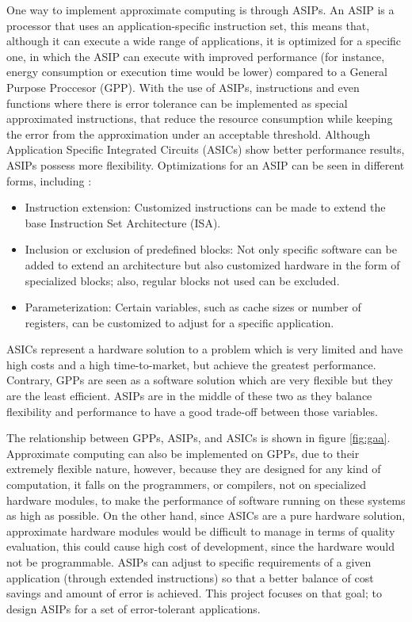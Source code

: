 \documentclass[conference]{IEEEtran}
\begin{document}
One way to implement approximate computing is through ASIPs. An ASIP is a processor that uses an application-specific instruction set, this means 
that, although it can execute a wide range of applications, it is optimized for a 
specific one, in which the ASIP can execute with improved performance (for instance, 
energy consumption or execution time would be lower) compared to a General Purpose Proccesor (GPP).
With the use of ASIPs, instructions and even functions where there is error tolerance can be
implemented as special approximated instructions, that reduce the resource consumption 
while keeping the error from the approximation under an acceptable threshold. Although Application Specific Integrated Circuits (ASICs) show better performance 
results, ASIPs possess more flexibility. Optimizations for an ASIP can be seen in different forms, 
including \cite{henkel2003closing}:

\begin{itemize}
 \item Instruction extension: Customized instructions can be made to extend the base Instruction Set Architecture (ISA).
 
 \item Inclusion or exclusion of predefined blocks: Not only specific software can be added 
 to extend an architecture but also customized hardware in the form of specialized blocks; 
 also, regular blocks not used can be excluded.
 
 \item Parameterization: Certain variables, such as cache sizes or number of registers, can 
 be customized to adjust for a specific application.
\end{itemize}

ASICs represent a hardware solution to a problem which is very limited and have high 
costs and a high time-to-market, but achieve the greatest performance. Contrary, GPPs 
are seen as a software solution which are very flexible but they are the least efficient. ASIPs
are in the middle of these two as they balance flexibility and performance to have a 
good trade-off between those variables. 


The relationship between GPPs, ASIPs, and ASICs is shown in figure \ref{fig:gaa}.
Approximate computing can also be implemented on GPPs, due to their extremely flexible nature,
however, because they are designed for any kind of computation, it falls on the programmers, or compilers, not on specialized hardware modules,
to make the performance of software running on these systems as high as possible. On the other hand, since ASICs are a pure hardware solution,
approximate hardware modules would be difficult to manage in terms of quality evaluation,
this could cause high cost of development, since the hardware would not be programmable. ASIPs can adjust to specific requirements of
a given application (through extended instructions) so that a better balance of cost savings and 
amount of error is achieved. This project focuses on that goal; to design ASIPs for a set 
of error-tolerant applications.
\end{document}
